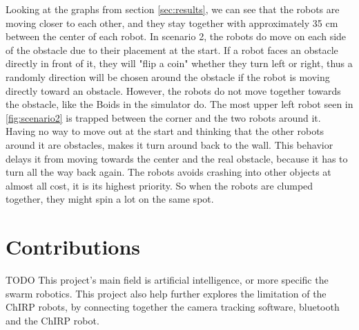 Looking at the graphs from section \ref{sec:results}, we can see that the robots are moving closer to each other, and they stay together with approximately 35 cm between the center of each robot. In scenario 2, the robots do move on each side of the obstacle due to their placement at the start. If a robot faces an obstacle directly in front of it, they will "flip a coin" whether they turn left or right, thus a randomly direction will be chosen around the obstacle if the robot is moving directly toward an obstacle.
However, the robots do not move together towards the obstacle, like the Boids in the simulator do. The most upper left robot seen in \ref{fig:scenario2} is trapped between the corner and the two robots around it. Having no way to move out at the start and thinking that the other robots around it are obstacles, makes it turn around back to the wall. This behavior delays it from moving towards the center and the real obstacle, because it has to turn all the way back again.
The robots avoids crashing into other objects at almost all cost, it is its highest priority. So when the robots are clumped together, they might spin a lot on the same spot.






\section{Contributions}
\label{sec:Contributions}
TODO
This project's main field is artificial intelligence, or more specific the swarm robotics. 
This project also help further explores the limitation of the ChIRP robots, by connecting together the camera tracking software, bluetooth and the ChIRP robot.


